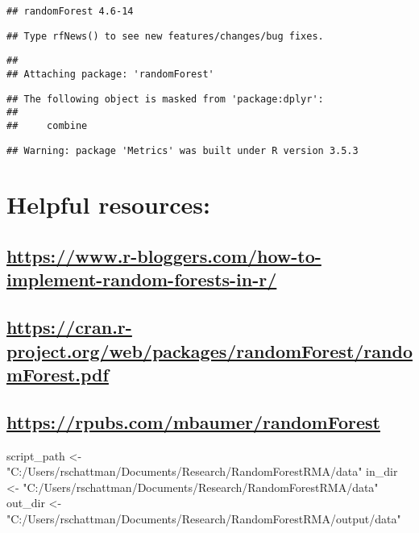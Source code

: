\documentclass[]{article}
\newenvironment{Shaded}{\begin{snugshade}}{\end{snugshade}}
\newcommand{\StringTok}[1]{\textcolor[rgb]{0.31,0.60,0.02}{{#1}}}
\newcommand{\NormalTok}[1]{{#1}}
\begin{document}
\begin{verbatim}
## randomForest 4.6-14
\end{verbatim}

\begin{verbatim}
## Type rfNews() to see new features/changes/bug fixes.
\end{verbatim}

\begin{verbatim}
## 
## Attaching package: 'randomForest'
\end{verbatim}

\begin{verbatim}
## The following object is masked from 'package:dplyr':
## 
##     combine
\end{verbatim}

\begin{verbatim}
## Warning: package 'Metrics' was built under R version 3.5.3
\end{verbatim}

\section{Helpful resources:}\label{helpful-resources}

\subsection{\texorpdfstring{\url{https://www.r-bloggers.com/how-to-implement-random-forests-in-r/}}{https://www.r-bloggers.com/how-to-implement-random-forests-in-r/}}\label{httpswww.r-bloggers.comhow-to-implement-random-forests-in-r}

\subsection{\texorpdfstring{\url{https://cran.r-project.org/web/packages/randomForest/randomForest.pdf}}{https://cran.r-project.org/web/packages/randomForest/randomForest.pdf}}\label{httpscran.r-project.orgwebpackagesrandomforestrandomforest.pdf}

\subsection{\texorpdfstring{\url{https://rpubs.com/mbaumer/randomForest}}{https://rpubs.com/mbaumer/randomForest}}\label{httpsrpubs.commbaumerrandomforest}

\begin{Shaded}
\begin{Highlighting}[]
\NormalTok{script_path <-}\StringTok{ "C:/Users/rschattman/Documents/Research/RandomForestRMA/data"}
\NormalTok{in_dir <-}\StringTok{ "C:/Users/rschattman/Documents/Research/RandomForestRMA/data"}
\NormalTok{out_dir <-}\StringTok{ "C:/Users/rschattman/Documents/Research/RandomForestRMA/output/data"}
\end{Highlighting}
\end{Shaded}
\end{document}
